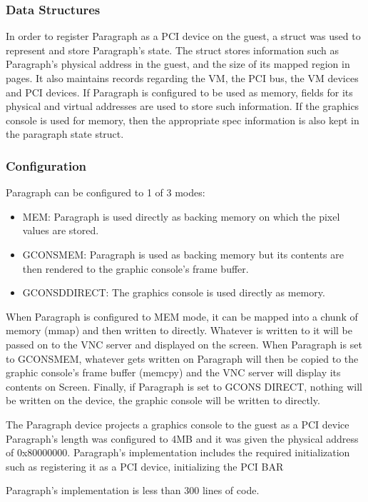 \documentclass{acm_proc_article-sp}
\begin{document}
\subsubsection{Data Structures}
In order to register Paragraph as a PCI device on the guest, a struct was used
to represent and store Paragraph's state. The struct stores information such as
Paragraph's physical address in the guest, and the size of its mapped region in
pages. It also maintains records regarding the VM, the PCI bus, the VM devices and PCI
devices. If Paragraph is configured to be used as memory, fields for its
physical and virtual addresses are used to store such information. If the
graphics console is used for memory, then the appropriate spec information is
also kept in the paragraph state struct. 
\subsubsection{Configuration}
Paragraph can be configured to 1 of 3 modes: \\
\begin{itemize}
\item MEM: Paragraph is used directly as backing memory on which the pixel values
are stored.
\item GCONS\textunderscore MEM: Paragraph is used as backing memory but its contents are
then rendered to the graphic console's frame buffer.
\item GCONSD\textunderscore DIRECT: The graphics console is used directly as memory.
\end{itemize}
When Paragraph is configured to MEM mode, it can be mapped into a chunk of
memory (mmap) and then written to directly. Whatever is written to it will be
passed on to the VNC server and displayed on the screen. When Paragraph is set
to GCONS\textunderscore MEM, whatever gets written on Paragraph will then be
copied to the graphic console's frame buffer (memcpy) and the VNC server will
display its contents on Screen. Finally, if Paragraph is set to GCONS
\textunderscore DIRECT, nothing will be written on the device, the graphic
console will be written to directly.

The Paragraph device projects a graphics console to the guest as a PCI device
Paragraph's length was configured to 4MB and it was given the physical address
of 0x80000000. Paragraph's implementation includes the required initialization
such as registering it as a PCI device, initializing the PCI BAR

Paragraph's implementation is less than 300 lines of code.
\end{document}
